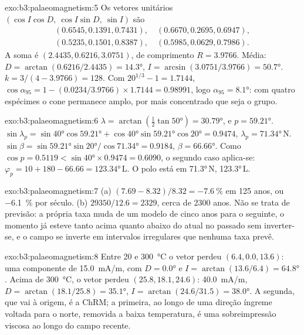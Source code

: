 \begin{solution}{exo:b3:palaeomagnetism:5}
Os vetores unitários $(\cos I\cos D,\ \cos I\sin D,\ \sin I)$ são
\begin{gather*}
  (0.6545, 0.1391, 0.7431),\quad (0.6670, 0.2695, 0.6947),\\
  (0.5235, 0.1501, 0.8387),\quad (0.5985, 0.0629, 0.7986).
\end{gather*}
A soma é $(2.4435, 0.6216, 3.0751)$, de comprimento $R = 3.9766$. Média:
$D = \arctan(0.6216/2.4435) = \ang{14.3}$, $I = \arcsin(3.0751/3.9766) =
\ang{50.7}$. $k = 3/(4 - 3.9766) = 128$. Com $20^{1/3} - 1 = 1.7144$,
$\cos\alpha_{95} = 1 - (0.0234/3.9766)\times1.7144 = 0.98991$, logo
$\alpha_{95} = \ang{8.1}$: com quatro espécimes o cone permanece amplo, por mais
concentrado que seja o grupo.
\end{solution}

\begin{solution}{exo:b3:palaeomagnetism:6}
$\lambda = \arctan(\tfrac12\tan\ang{50}) = \ang{30.79}$, e $p = \ang{59.21}$.
$\sin\lambda_p = \sin\ang{40}\cos\ang{59.21} + \cos\ang{40}\sin\ang{59.21}
\cos\ang{20} = 0.9474$, $\lambda_p = \ang{71.34}$\,N. $\sin\beta =
\sin\ang{59.21}\sin\ang{20}/\cos\ang{71.34} = 0.9184$, $\beta = \ang{66.66}$.
Como $\cos p = 0.5119 < \sin\ang{40}\times0.9474 = 0.6090$, o segundo caso
aplica-se: $\varphi_p = 10 + 180 - 66.66 = \ang{123.34}$\,L. O polo está em
\ang{71.3}\,N, \ang{123.3}\,L.
\end{solution}

\begin{solution}{exo:b3:palaeomagnetism:7}
(a) $(7.69 - 8.32)/8.32 = \qty{-7.6}{\percent}$ em 125 anos, ou
\qty{-6.1}{\percent} por século. (b) $29350/12.6 = 2329$, cerca de 2300 anos.
Não se trata de previsão: a própria taxa muda de um modelo de cinco anos para o
seguinte, o momento já esteve tanto acima quanto abaixo do atual no passado sem
inverter-se, e o campo se inverte em intervalos irregulares que nenhuma taxa
prevê.
\end{solution}

\begin{solution}{exo:b3:palaeomagnetism:8}
Entre 20 e \qty{300}{\celsius} o vetor perdeu $(6.4, 0.0, 13.6)$: uma
componente de \qty{15.0}{mA/m}, com $D = \ang{0.0}$ e
$I = \arctan(13.6/6.4) = \ang{64.8}$. Acima de \qty{300}{\celsius}, o vetor perdeu $(25.8, 18.1, 24.6)$:
\qty{40.0}{mA/m}, $D = \arctan(18.1/25.8) = \ang{35.1}$, $I =
\arctan(24.6/31.5) = \ang{38.0}$. A segunda, que vai à origem, é a
ChRM; a primeira, ao longo de uma direção íngreme voltada para o norte, removida a
baixa temperatura, é uma sobreimpressão viscosa ao longo do campo recente.
\end{solution}

